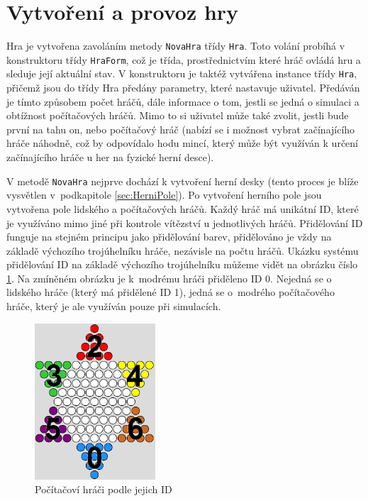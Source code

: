 \section{Vytvoření a provoz hry}
\label{sec:VytvoreniAProvozHry}
Hra je vytvořena zavoláním metody \lstinline$NovaHra$ třídy \lstinline$Hra$. Toto volání probíhá v konstruktoru třídy \lstinline$HraForm$, což je třída, prostřednictvím které hráč ovládá hru a sleduje její aktuální stav. V konstruktoru je taktéž vytvářena instance třídy \lstinline$Hra$, přičemž jsou do třídy Hra předány parametry, které nastavuje uživatel. Předáván je tímto způsobem počet hráčů, dále informace o tom, jestli se jedná o simulaci a obtížnost počítačových hráčů. Mimo to si uživatel může také zvolit, jestli bude první na tahu on, nebo počítačový hráč (nabízí se i možnost vybrat začínajícího hráče náhodně, což by odpovídalo hodu mincí, který může být využíván k určení začínajícího hráče u her na fyzické herní desce). 

V metodě \lstinline$NovaHra$ nejprve dochází k vytvoření herní desky (tento proces je blíže vysvětlen v~podkapitole \ref{sec:HerniPole}). Po vytvoření herního pole jsou vytvořena pole lidského a počítačových hráčů. Každý hráč má unikátní ID, které je využíváno mimo jiné při kontrole vítězství u jednotlivých hráčů. Přidělování ID funguje na stejném principu jako přidělování barev, přidělováno je vždy na základě výchozího trojúhelníku hráče, nezávisle na počtu hráčů. Ukázku systému přidělování ID na základě výchozího trojúhelníku můžeme vidět na obrázku číslo \ref{fig:IDPocitacovychHracu}. Na zmíněném obrázku je k~modrému hráči přiděleno ID 0. Nejedná se o lidského hráče (který má přidělené ID 1), jedná se o~modrého počítačového hráče, který je ale využíván pouze při simulacích.

\begin{figure}
	\centering
	\includegraphics[width=0.4\textwidth]{Figures/IDPocitacovychHracu.png}
	\caption{Počítačoví hráči podle jejich ID}
    \label{fig:IDPocitacovychHracu}
\end{figure}


